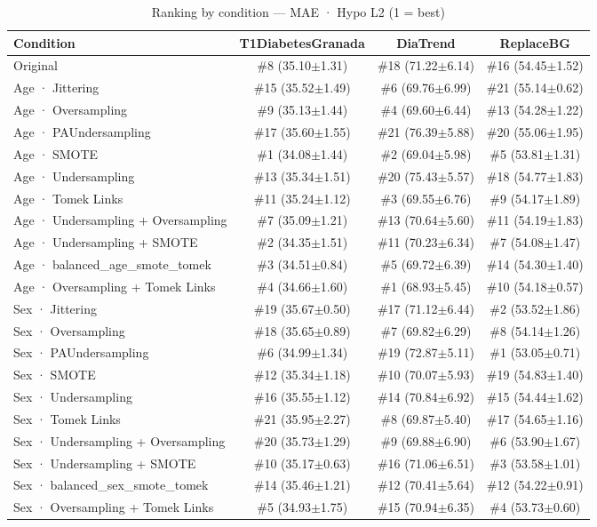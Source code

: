 \begin{table}[htbp]
\centering
\small
\caption{Ranking by condition — MAE · Hypo L2  (1 = best)}
\label{tab:ranking_mae_tbr_2}
\begin{tabular}{lccc}
\toprule
\textbf{Condition} & \textbf{T1DiabetesGranada} & \textbf{DiaTrend} & \textbf{ReplaceBG} \\
\midrule
Original & \#8 (35.10$\pm$1.31) & \#18 (71.22$\pm$6.14) & \#16 (54.45$\pm$1.52) \\
Age · Jittering & \#15 (35.52$\pm$1.49) & \#6 (69.76$\pm$6.99) & \#21 (55.14$\pm$0.62) \\
Age · Oversampling & \#9 (35.13$\pm$1.44) & \#4 (69.60$\pm$6.44) & \#13 (54.28$\pm$1.22) \\
Age · PAUndersampling & \#17 (35.60$\pm$1.55) & \#21 (76.39$\pm$5.88) & \#20 (55.06$\pm$1.95) \\
Age · SMOTE & \#1 (34.08$\pm$1.44) & \#2 (69.04$\pm$5.98) & \#5 (53.81$\pm$1.31) \\
Age · Undersampling & \#13 (35.34$\pm$1.51) & \#20 (75.43$\pm$5.57) & \#18 (54.77$\pm$1.83) \\
Age · Tomek Links & \#11 (35.24$\pm$1.12) & \#3 (69.55$\pm$6.76) & \#9 (54.17$\pm$1.89) \\
Age · Undersampling + Oversampling & \#7 (35.09$\pm$1.21) & \#13 (70.64$\pm$5.60) & \#11 (54.19$\pm$1.83) \\
Age · Undersampling + SMOTE & \#2 (34.35$\pm$1.51) & \#11 (70.23$\pm$6.34) & \#7 (54.08$\pm$1.47) \\
Age · balanced_age_smote_tomek & \#3 (34.51$\pm$0.84) & \#5 (69.72$\pm$6.39) & \#14 (54.30$\pm$1.40) \\
Age · Oversampling + Tomek Links & \#4 (34.66$\pm$1.60) & \#1 (68.93$\pm$5.45) & \#10 (54.18$\pm$0.57) \\
\midrule
Sex · Jittering & \#19 (35.67$\pm$0.50) & \#17 (71.12$\pm$6.44) & \#2 (53.52$\pm$1.86) \\
Sex · Oversampling & \#18 (35.65$\pm$0.89) & \#7 (69.82$\pm$6.29) & \#8 (54.14$\pm$1.26) \\
Sex · PAUndersampling & \#6 (34.99$\pm$1.34) & \#19 (72.87$\pm$5.11) & \#1 (53.05$\pm$0.71) \\
Sex · SMOTE & \#12 (35.34$\pm$1.18) & \#10 (70.07$\pm$5.93) & \#19 (54.83$\pm$1.40) \\
Sex · Undersampling & \#16 (35.55$\pm$1.12) & \#14 (70.84$\pm$6.92) & \#15 (54.44$\pm$1.62) \\
Sex · Tomek Links & \#21 (35.95$\pm$2.27) & \#8 (69.87$\pm$5.40) & \#17 (54.65$\pm$1.16) \\
Sex · Undersampling + Oversampling & \#20 (35.73$\pm$1.29) & \#9 (69.88$\pm$6.90) & \#6 (53.90$\pm$1.67) \\
Sex · Undersampling + SMOTE & \#10 (35.17$\pm$0.63) & \#16 (71.06$\pm$6.51) & \#3 (53.58$\pm$1.01) \\
Sex · balanced_sex_smote_tomek & \#14 (35.46$\pm$1.21) & \#12 (70.41$\pm$5.64) & \#12 (54.22$\pm$0.91) \\
Sex · Oversampling + Tomek Links & \#5 (34.93$\pm$1.75) & \#15 (70.94$\pm$6.35) & \#4 (53.73$\pm$0.60) \\
\bottomrule
\end{tabular}
\end{table}